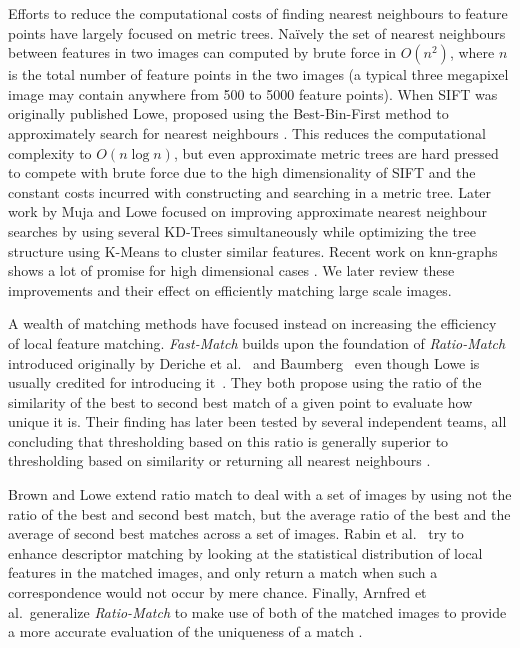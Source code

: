 \documentclass[10pt,twocolumn,letterpaper]{article}
\begin{document}
Efforts to reduce the computational costs of finding nearest neighbours to feature points have largely focused on metric trees. Na\"ively the set of nearest neighbours between features in two images can computed by brute force in $O(n^2)$, where $n$ is the total number of feature points in the two images (a typical three megapixel image may contain anywhere from 500 to 5000 feature points). When SIFT was originally published Lowe, proposed using the Best-Bin-First method to approximately search for nearest neighbours \cite{beis1997shape,lowe1999object}. This reduces the computational complexity to $O(n\log n)$, but even approximate metric trees are hard pressed to compete with brute force due to the high dimensionality of SIFT and the constant costs incurred with constructing and searching in a metric tree. Later work by Muja and Lowe \cite{muja2009fast} focused on improving approximate nearest neighbour searches by using several KD-Trees simultaneously while optimizing the tree structure using K-Means to cluster similar features. Recent work on knn-graphs shows a lot of promise for high dimensional cases \cite{dong2011efficient}. We later review these improvements and their effect on efficiently matching large scale images.

A wealth of matching methods have focused instead on increasing the efficiency of local feature matching. \emph{Fast-Match} builds upon the foundation of \emph{Ratio-Match} introduced originally by Deriche et al.~\cite{deriche1994robust} and Baumberg~\cite{baumberg2000reliable} even though Lowe is usually credited for introducing it~\cite{lowe2004sift}. They both propose using the ratio of the similarity of the best to second best match of a given point to evaluate how unique it is. Their finding has later been tested by several independent teams, all concluding that thresholding based on this ratio is generally superior to thresholding based on similarity or returning all nearest neighbours \cite{lowe2004sift,mikolajczyk2005performance,moreels2007evaluation,rabin2009statistical}.

Brown and Lowe \cite{brown2005multi} extend ratio match to deal with a set of images by using not the ratio of the best and second best match, but the average ratio of the best and the average of second best matches across a set of images.  Rabin et al.\ \cite{rabin2009statistical} try to enhance descriptor matching by looking at the statistical distribution of local features in the matched images, and only return a match when such a correspondence would not occur by mere chance. Finally, Arnfred et al.\ generalize \emph{Ratio-Match} to make use of both of the matched images to provide a more accurate evaluation of the uniqueness of a match \cite{arnfred2013mirror}.
\end{document}
